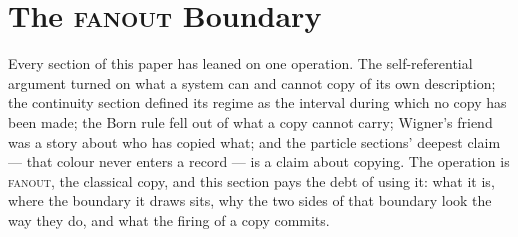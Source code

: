 %
%      
%      
%
%
%

\section{The \textsc{fanout} Boundary}
\label{app:fanout-boundary}

Every section of this paper has leaned on one operation. The self-referential argument turned on
what a system can and cannot copy of its own description; the continuity section defined its regime
as the interval during which no copy has been made; the Born rule fell out of what a copy cannot
carry; Wigner's friend was a story about who has copied what; and the particle sections' deepest
claim --- that colour never enters a record --- is a claim about copying. The operation is
\textsc{fanout}, the classical copy, and this section pays the debt of using it: what it is, where
the boundary it draws sits, why the two sides of that boundary look the way they do, and what the
firing of a copy commits.

